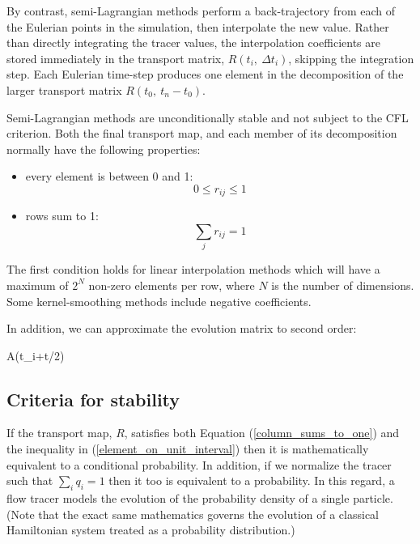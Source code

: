 By contrast, semi-Lagrangian methods perform a back-trajectory from each of the Eulerian
points in the simulation, then interpolate the new value.  Rather than
directly integrating the tracer values, 
the interpolation coefficients are stored immediately
in the transport matrix, $R(t_i,~\Delta t_i)$, skipping the integration
step.
Each Eulerian time-step produces one element in the decomposition of the
larger transport matrix $R(t_0,~t_n-t_0)$.

Semi-Lagrangian methods are unconditionally stable and not subject to the
CFL criterion.
Both the final transport map, and each member of its decomposition normally have
the following properties:
\begin{itemize}
\item every element is between 0 and 1:
\begin{equation}
0 \le r_{ij} \le 1
\label{element_on_unit_interval}
\end{equation}
\item rows sum to 1:
\begin{equation}
\sum_j r_{ij} = 1
\label{rowssumtoone}
\end{equation}
\end{itemize}
The first condition holds for linear interpolation methods which will have
a maximum of $2^N$ non-zero elements per row, 
where $N$ is the number of dimensions. 
Some kernel-smoothing methods include negative coefficients.

In addition, we can approximate the evolution matrix to second order:
\begin{eqnl}
A(t_i+\Delta t/2) \approx {} 
\end{eqnl}

\subsection{Criteria for stability}

If the transport map, $R$, satisfies both Equation (\ref{column_sums_to_one})
and the inequality in (\ref{element_on_unit_interval}) then it is mathematically
equivalent to a conditional probability.
In addition, if we normalize the tracer such that $\sum_i q_i=1$
then it too is equivalent to a probability.
In this regard, a flow tracer models the evolution of 
the probability density of a single particle.
(Note that the exact same mathematics governs the evolution of a classical
Hamiltonian system treated as a probability distribution.)

